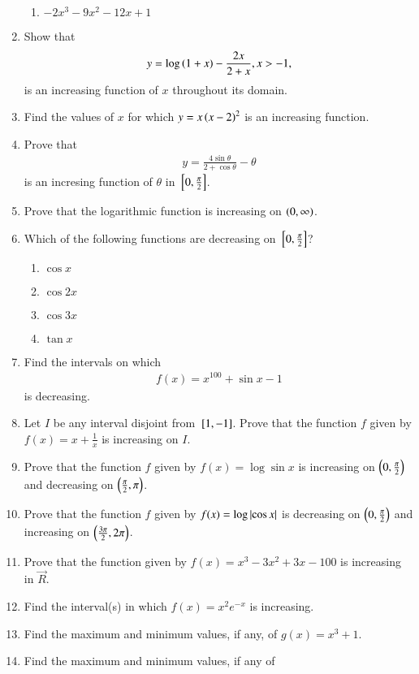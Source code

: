 \begin{enumerate}[label=\arabic*.,ref=\thesubsection.\theenumi]
\begin{enumerate}
\item $-2x^3-9x^2-12x+1$
\end{enumerate}
%
\item Show that 
%
\begin{align}
y = \log \left(1+x\right)-\frac{2x}{2+x}, x > -1,
\end{align}
%
is an increasing function of $x$ throughout its domain.
%
\item Find the values of $x$ for which $y = x\left(x-2\right)^2$ is an increasing function.
%
\item Prove that
%
\begin{align}
y = \frac{4\sin \theta}{2+\cos \theta} - \theta
\end{align}
%
is an incresing function of $\theta$ in ${}\left[0,\frac{\pi}{2}\right]$.
\item Prove that the logarithmic function is increasing on $\left(0, \infty\right)$.
\item Which of the following functions are decreasing on ${}\left[0,\frac{\pi}{2}\right]$?
%
\begin{enumerate}
\item $\cos x$
\item $\cos 2x$
\item $\cos 3x$
\item $\tan x$
\end{enumerate}
%
\item Find the intervals on which 
%
\begin{align}
f(x) = x^{100}+\sin x -1
\end{align}
%
is decreasing.
\item Let $I$ be any interval disjoint from ${}\left[1,-1\right]$.  Prove that the function $f$ given by $f(x) = x +\frac{1}{x}$ is increasing on $I$.
\item Prove that the function $f$ given by $f(x) = \log \sin x$ is increasing on $\left(0,\frac{\pi}{2}\right)$ and decreasing on $\left(\frac{\pi}{2}, \pi\right)$.
\item Prove that the function $f$ given by $f(x) = \log \left\vert\cos x\right\vert$ is decreasing on $\left(0,\frac{\pi}{2}\right)$ and increasing on $\left(\frac{3\pi}{2}, 2\pi\right)$.
\item Prove that the function given by $f(x) = x^3-3x^2+3x-100$ is increasing in $\vec{R}$.
\item Find the interval(s) in which $f(x) = x^2e^{-x}$ is increasing.
\item Find the maximum and minimum values, if any, of $g(x) = x^3+1$.
%
\item Find the maximum and minimum values, if any of

\end{enumerate}

